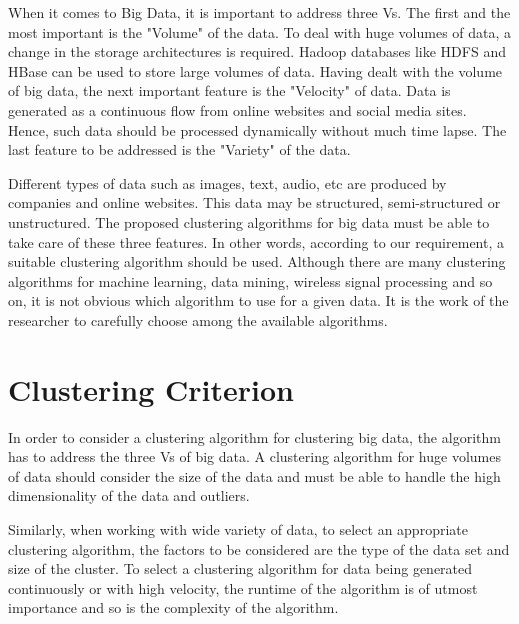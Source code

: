 \documentclass[sigconf]{acmart}
\begin{document}
When it comes to Big Data, it is important to address three Vs. The first and the most important is the "Volume" of the data. To deal with huge volumes of data, a change in the storage architectures is required. Hadoop databases like HDFS and HBase can be used to store large volumes of data. Having dealt with the volume of big data, the next important feature is the "Velocity" of data. Data is generated as a continuous flow from online websites and social media sites. Hence, such data should be processed dynamically without much time lapse. The last feature to be addressed is the "Variety" of the data.

Different types of data such as images, text, audio, etc are produced by companies and online websites. This data may be structured, semi-structured or unstructured. The proposed clustering algorithms for big data must be able to take care of these three features. In other words, according to our requirement, a suitable clustering algorithm should be used. Although there are many clustering algorithms for machine learning\cite{Xu2005}, data mining\cite{Aggarwal2012}, wireless signal processing\cite{Abbasi2007} and so on, it is not obvious which algorithm to use for a given data. It is the work of the researcher to carefully choose among the available algorithms. 

\section{Clustering Criterion}
In order to consider a clustering algorithm for clustering big data, the algorithm has to address the three Vs of big data. A clustering algorithm for huge volumes of data should consider the size of the data and must be able to handle the high dimensionality of the data and outliers.

Similarly, when working with wide variety of data, to select an appropriate clustering algorithm, the factors to be considered are the type of the data set and size of the cluster. To select a clustering algorithm for data being generated continuously or with high velocity, the runtime of the algorithm is of utmost importance and so is the complexity of the algorithm.
\end{document}
